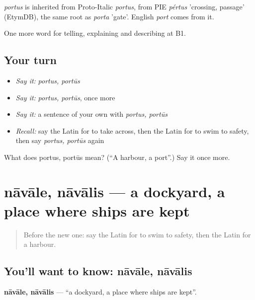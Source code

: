 \begin{cousinweb}
\emph{portus} is inherited from Proto-Italic \emph{portus}, from PIE \emph{pértus} 'crossing, passage' (EtymDB), the same root as \emph{porta} 'gate'. English \emph{port} comes from it.
\end{cousinweb}

\begin{grammarlens}[title={What you've built}]
One more word for telling, explaining and describing at B1.
\end{grammarlens}

\subsection*{Your turn}
\begin{itemize}
\raggedright
  \item \emph{Say it:} \emph{portus, portūs}
  \item \emph{Say it:} \emph{portus, portūs}, once more
  \item \emph{Say it:} a sentence of your own with \emph{portus, portūs}
  \item \emph{Recall:} say the Latin for to take across, then the Latin for to swim to safety, then say \emph{portus, portūs} again
\end{itemize}

\begin{tcolorbox}[breakable,colback=teal!4,colframe=teal!35!black,title={Before you move on}]
What does portus, portūs mean? (\textquotedblleft{}A harbour, a port\textquotedblright{}.) Say it once more.
\end{tcolorbox}
\section[nāvāle, nāvālis]{nāvāle, nāvālis — a dockyard, a place where ships are kept}

\label{lesson:LA-C441-navale}



\begin{quote}
Before the new one: say the Latin for to swim to safety, then the Latin for a harbour.
\end{quote}

\subsection*{You'll want to know: nāvāle, nāvālis}
\textbf{nāvāle, nāvālis} — \textquotedblleft{}a dockyard, a place where ships are kept\textquotedblright{}.

